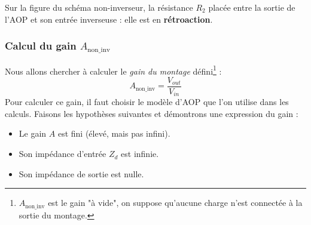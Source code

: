 Sur la figure du schéma non-inverseur, la résistance $R_2$ placée entre la sortie de l'AOP et son entrée inverseuse : elle est en \textbf{rétroaction}. 


\subsubsection{Calcul du gain $A_{\text{non\_inv}}$}
Nous allons chercher à calculer le \textit{gain du montage} défini\footnote{$A_{\text{non\_inv}}$ est le gain "à vide", on suppose qu'aucune charge n'est connectée à la sortie du montage.} :
\begin{equation}
	A_{\text{non\_inv}} = \frac{V_{out}}{V_{in}}
\end{equation}
Pour calculer ce gain, il faut choisir le modèle d'AOP que l'on utilise dans les calculs. Faisons les hypothèses suivantes et démontrons une expression du gain :
\begin{itemize}
	\item Le gain $A$ est fini (élevé, mais pas infini).
	\item Son impédance d'entrée $Z_d$ est infinie.
	\item Son impédance de sortie est nulle.
\end{itemize}
